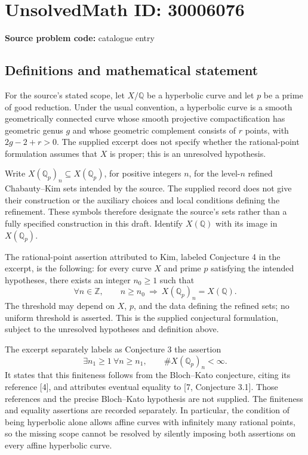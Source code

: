 \documentclass[11pt]{article}
\newcommand{\Z}{\mathbb{Z}}
\newcommand{\Q}{\mathbb{Q}}
\begin{document}
\section*{UnsolvedMath ID: 30006076}
\textbf{Source problem code:} catalogue entry
\subsection{Definitions and mathematical statement}
For the source's stated scope, let \(X/\Q\) be a hyperbolic curve and let \(p\) be a prime of good reduction. Under the usual convention, a hyperbolic curve is a smooth geometrically connected curve whose smooth projective compactification has geometric genus \(g\) and whose geometric complement consists of \(r\) points, with \(2g-2+r>0\). The supplied excerpt does not specify whether the rational-point formulation assumes that \(X\) is proper; this is an unresolved hypothesis.

Write \(X(\Q_p)_n\subseteq X(\Q_p)\), for positive integers \(n\), for the level-\(n\) refined Chabauty--Kim sets intended by the source. The supplied record does not give their construction or the auxiliary choices and local conditions defining the refinement. These symbols therefore designate the source's sets rather than a fully specified construction in this draft. Identify \(X(\Q)\) with its image in \(X(\Q_p)\).

The rational-point assertion attributed to Kim, labeled Conjecture 4 in the excerpt, is the following: for every curve \(X\) and prime \(p\) satisfying the intended hypotheses, there exists an integer \(n_0\geq 1\) such that
\[
\forall n\in\Z,\qquad n\geq n_0\ \Longrightarrow\ X(\Q_p)_n=X(\Q).
\]
The threshold may depend on \(X\), \(p\), and the data defining the refined sets; no uniform threshold is asserted. This is the supplied conjectural formulation, subject to the unresolved hypotheses and definition above.

The excerpt separately labels as Conjecture 3 the assertion
\[
\exists n_1\geq 1\ \forall n\geq n_1,\qquad \#X(\Q_p)_n<\infty.
\]
It states that this finiteness follows from the Bloch--Kato conjecture, citing its reference [4], and attributes eventual equality to [7, Conjecture 3.1]. Those references and the precise Bloch--Kato hypothesis are not supplied. The finiteness and equality assertions are recorded separately. In particular, the condition of being hyperbolic alone allows affine curves with infinitely many rational points, so the missing scope cannot be resolved by silently imposing both assertions on every affine hyperbolic curve.
\end{document}
